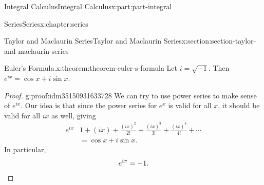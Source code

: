 \documentclass[twoside,10pt,]{tufte-book}
\numberwithin{equation}{part}
\newcommand{\qedhere}{\relax}
\newcommand{\amp}{&}
\begin{document}
\begin{partptx}{Integral Calculus}{}{Integral Calculus}{}{}{x:part:part-integral}
\begin{chapterptx}{Series}{}{Series}{}{}{x:chapter:series}
\begin{sectionptx}{Taylor and Maclaurin Series}{}{Taylor and Maclaurin Series}{}{}{x:section:section-taylor-and-maclaurin-series}
\begin{theorem}{Euler's Formula.}{}{x:theorem:theorem-euler-s-formula}%
Let \(i = \sqrt{-1}\). Then \(e^{ix} = \cos x + i\sin x\).%
\end{theorem}
\begin{proof}{}{g:proof:idm35150931633728}
We can try to use power series to make sense of \(e^{ix}\). Our idea is that since the power series for \(e^{x}\) is valid for all \(x\), it should be valid for all \(ix\) as well, giving%
\begin{align*}
e^{ix} \amp 1 + (ix) + \frac{(ix)^{2}}{2!} + \frac{(ix)^{3}}{3!} + \frac{(ix)^{4}}{4!} + \cdots \\
\amp = \cos x + i\sin x \text{.}
\end{align*}
In particular,%
\begin{equation*}
e^{i\pi} = -1\text{.}\qedhere
\end{equation*}
%
\end{proof}
\end{sectionptx}
\end{chapterptx}
 \end{partptx}
%
%
\typeout{************************************************}
\typeout{************************************************}
%
\end{document}

